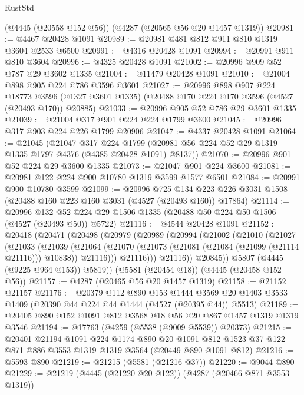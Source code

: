 \begin{lexlean}{RustStd}
\begin{coremodule}
{\begin{coremodule}
{{{{{{{{{{{{{{{{{{{{{{{{{{{{{{{{{{{{{{    (@4445 (@20558 @152 @56))
    (@4287 (@20565 @56 @20 @1457 @1319))
@20981 := @4467 @20428 @1091
@20989 := @20981 @481 @812 @911 @810 @1319 @3604 @2533 @6500
@20991 := @4316 @20428 @1091
@20994 := @20991 @911 @810 @3604
@20996 := @4325 @20428 @1091
@21002 := @20996 @909 @52 @787 @29 @3602 @1335
@21004 := @11479 @20428 @1091
@21010 := @21004 @898 @905 @224 @786 @3596 @3601
@21027 := @20996
    @898
    @907
    @224
    @18773
    @3596
    (@1327 @3601 @1335)
    (@20488 @170 @224 @170 @3596 (@4527 (@20493 @170)) @20885)
@21033 := @20996 @905 @52 @786 @29 @3601 @1335
@21039 := @21004 @317 @901 @224 @224 @1799 @3600
@21045 := @20996 @317 @903 @224 @226 @1799 @20906
@21047 := @4337 @20428 @1091
@21064 := @21045
    (@21047
      @317
      @224
      @1799
      (@20981 @56 @224 @52 @29 @1319 @1335 @1797 @4376 (@4385 @20428 @1091) @8137))
@21070 := @20996 @901 @52 @224 @29 @3600 @1335
@21073 := @21047 @901 @224 @3600
@21081 := @20981 @122 @224 @900 @10780 @1319 @3599 @1577 @6501
@21084 := @20991 @900 @10780 @3599
@21099 := @20996
    @725
    @134
    @223
    @226
    @3031
    @1508
    (@20488 @160 @223 @160 @3031 (@4527 (@20493 @160)) @17864)
@21114 := @20996
    @132
    @52
    @224
    @29
    @1506
    @1335
    (@20488 @50 @224 @50 @1506 (@4527 (@20493 @50)) @5722)
@21116 := @4544 @20428 @1091
@21152 := @20418
    (@20471
      (@20498
        (@20979
          (@20989
            (@20994
              (@21002
                (@21010
                  (@21027
                    (@21033
                      (@21039
                        (@21064
                          (@21070
                            (@21073 (@21081 (@21084 (@21099 (@21114 @21116))) @10838))
                            @21116)))
                      @21116)))
                @21116))
            @20845))
        @5807
        (@4445 (@9225 @964 @153))
        @5819))
    (@5581 (@20454 @18))
    (@4445 (@20458 @152 @56))
@21157 := @4287 (@20465 @56 @20 @1457 @1319)
@21158 := @21152 @21157
@21176 := @20379
    @112
    @890
    @153
    @1444
    @3569
    @20
    @1403
    @3533
    @1409
    (@20390 @44 @224 @44 @1444 (@4527 (@20395 @44)) @5513)
@21189 := @20405 @890 @152 @1091 @812 @3568 @18 @56 @20 @867 @1457 @1319 @1319 @3546
@21194 := @17763 (@4259 (@5538 (@9009 @5539)) @20373)
@21215 := @20401
    @21194
    @1091
    @224
    @1174
    @890
    @20
    @1091
    @812
    @1523
    @37
    @122
    @871
    @886
    @3553
    @1319
    @1319
    @3564
    (@20449 @890 @1091 @812)
@21216 := @5593 @890
@21219 := @21215 (@5581 (@21216 @37))
@21220 := @9044 @890
@21229 := @21219 (@4445 (@21220 @20 @122)) (@4287 (@20466 @871 @3553 @1319))
}}}}}}}}}}}}}}}}}}}}}}}}}}}}}}}}}}}}}}
\end{coremodule}}
\end{coremodule}
\end{lexlean}
